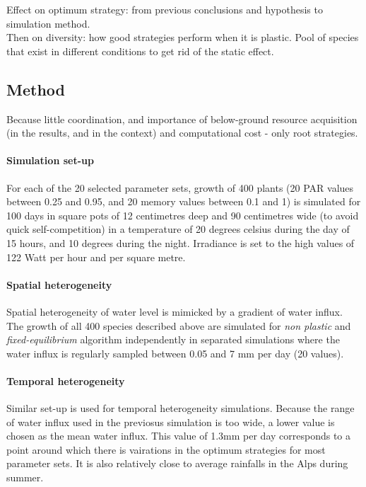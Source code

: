 Effect on optimum strategy: from previous conclusions and hypothesis to simulation method.\\
Then on diversity: how good strategies perform when it is plastic. Pool of species that exist in different conditions to get rid of the static effect.

\subsection{Method}

Because little coordination, and importance of below-ground resource acquisition (in the results, and in the context) and computational cost - only root strategies.

\paragraph{Simulation set-up}
For each of the 20 selected parameter sets, growth of 400 plants (20 PAR values between 0.25 and 0.95, and 20 memory values between 0.1 and 1) is simulated for 100 days in square pots of 12 centimetres deep and 90 centimetres wide (to avoid quick self-competition) in a temperature of 20 degrees celsius during the day of 15 hours, and 10 degrees during the night. Irradiance is set to the high values of 122 Watt per hour and per square metre. 

\paragraph{Spatial heterogeneity}
Spatial heterogeneity of water level is mimicked by a gradient of water influx. The growth of all 400 species described above are simulated for \textit{non plastic} and \textit{fixed-equilibrium} algorithm independently in separated simulations where the water influx is regularly sampled between 0.05 and 7 mm per day (20 values).

\paragraph{Temporal heterogeneity}
Similar set-up is used for temporal heterogeneity simulations. Because the range of water influx used in the previosus simulation is too wide, a lower value is chosen as the mean water influx. This value of 1.3mm per day corresponds to a point around which there is vairations in the optimum strategies for most parameter sets. It is also relatively close to average rainfalls in the Alps during summer. 

